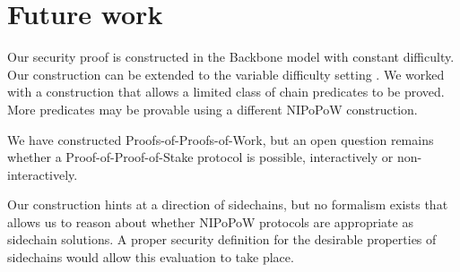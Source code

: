 \section{Future work}

Our security proof is constructed in the Backbone \cite{backbone} model with
constant difficulty. Our construction can be extended to the variable difficulty
setting \cite{backbone2}. We worked with a construction that allows a limited
class of chain predicates to be proved. More predicates may be provable using a
different NIPoPoW construction.

We have constructed Proofs-of-Proofs-of-Work, but an open question remains
whether a Proof-of-Proof-of-Stake protocol is possible, interactively or
non-interactively.

Our construction hints at a direction of sidechains, but no formalism exists
that allows us to reason about whether NIPoPoW protocols are appropriate as
sidechain solutions. A proper security definition for the desirable properties
of sidechains would allow this evaluation to take place.
